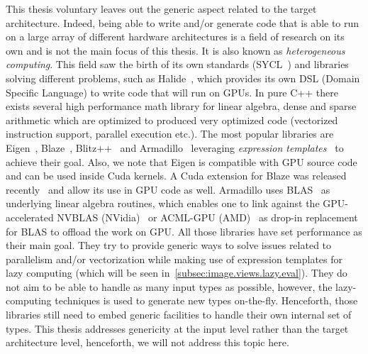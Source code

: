 This thesis voluntary leaves out the generic aspect related to the target architecture. Indeed, being able to write
and/or generate code that is able to run on a large array of different hardware architectures is a field of research on
its own and is not the main focus of this thesis. It is also known as \emph{heterogeneous computing}. This field saw the
birth of its own standards (SYCL~\parencite{brown.2019.heterogeneous,wong.2019.heterogeneous}) and libraries solving
different problems, such as Halide~\parencite{ragankelley.2013.halide}, which provides its own DSL (Domain Specific
Language) to write code that will run on GPUs. In pure C++ there exists several high performance math library for linear
algebra, dense and sparse arithmetic which are optimized to produced very optimized code (vectorized instruction
support, parallel execution etc.). The most popular libraries are Eigen~\parencite{guennebaud.2010.eigen},
Blaze~\parencite{iglberger.2012_1.blaze,iglberger.2012_2.blaze,iglberger.2012.blaze},
Blitz++~\parencite{veldhuizen.2000.blitz,veldhuizen.1998.arrays} and
Armadillo~\parencite{sanderson.2016.armadillo,sanderson.2016.armadillo-art,sanderson.2018.armadillo-proc} leveraging
\emph{expression templates}~\parencite{veldhuizen.1995.expression} to achieve their goal. Also, we note that Eigen is
compatible with GPU source code~\parencite{guennebaud.2010.eigen-cuda} and can be used inside Cuda kernels. A Cuda
extension for Blaze was released recently~\parencite{penuchot.2019.blaze-cuda} and allow its use in GPU code as well.
Armadillo uses BLAS~\parencite{blackford.2002.blas} as underlying linear algebra routines, which enables one to link
against the GPU-accelerated NVBLAS (NVidia)~\parencite{nvidia.2022.nvblas} or ACML-GPU
(AMD)~\parencite{amd.2013.acml-gpu} as drop-in replacement for BLAS to offload the work on GPU. All those libraries have
set performance as their main goal. They try to provide generic ways to solve issues related to parallelism and/or
vectorization while making use of expression templates for lazy computing (which will be seen
in~\cref{subsec:image.views.lazy.eval}). They do not aim to be able to handle as many input types as possible, however,
the lazy-computing techniques is used to generate new types on-the-fly. Henceforth, those libraries still need to embed
generic facilities to handle their own internal set of types. This thesis addresses genericity at the input level rather
than the target architecture level, henceforth, we will not address this topic here.

